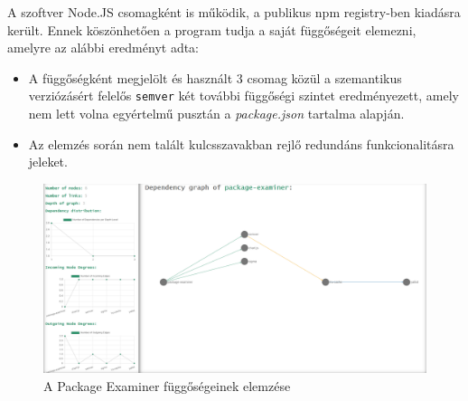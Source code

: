 
A szoftver Node.JS csomagként is működik, a publikus npm registry-ben kiadásra került. Ennek köszönhetően a program tudja a saját függőségeit elemezni, amelyre az alábbi eredményt adta:

\begin{itemize}
	\item A függőségként megjelölt és használt 3 csomag közül a szemantikus verziózásért felelős \texttt{semver} két további függőségi szintet eredményezett, amely nem lett volna egyértelmű pusztán a \emph{package.json} tartalma alapján.
	\item Az elemzés során nem talált kulcsszavakban rejlő redundáns funkcionalitásra jeleket.
\end{itemize}

\begin{figure}[!h]
	\centering
	\includegraphics[scale=0.25]{images/package-examiner.png}
	\caption{A Package Examiner függőségeinek elemzése}
	\label{fig:package-examiner}
\end{figure}